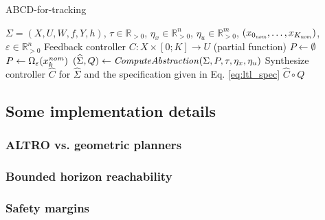 \begin{algorithm}
	\caption{ABCD-for-tracking}
	\label{alg:abcd-with-time-for-tracking}
	\begin{algorithmic}[1]
		\Require $\Sigma=(X,U,W,f,Y,h)$, $\tau \in \mathbb{R}_{>0}$, $\eta_x\in \mathbb{R}^n_{>0}$, $\eta_u\in \mathbb{R}^m_{>0}$, $(x_{0_{\mathit{nom}}},\ldots,x_{K_{\mathit{nom}}})$, $\varepsilon \in \mathbb{R}_{>0}^{n}$
		\Ensure Feedback controller $C\colon X\times [0;K]\to U$ (partial function)
		\State $P \gets \emptyset$
		\State $P \gets \Omega_{\varepsilon}(x_k^{\mathit{nom}})$
		\EndFor
		\State $(\widehat{\Sigma},Q) \gets \mathit{ComputeAbstraction}(\Sigma, P, \tau, \eta_{x} , \eta_u)$
		\State Synthesize controller $\widehat{C}$ for $\widehat{\Sigma}$ and the specification given in Eq. \eqref{eq:ltl_spec} %
		\State \Return $\widehat{C}\circ Q$
	\end{algorithmic}
\end{algorithm}

\subsection{Some implementation details}

\subsubsection{ALTRO vs. geometric planners}

\subsubsection{Bounded horizon reachability}

\subsubsection{Safety margins}

%


